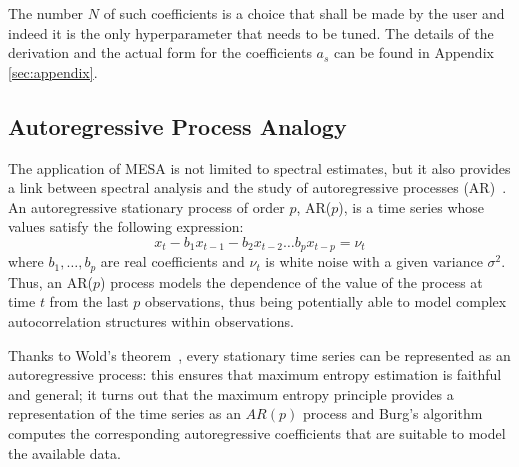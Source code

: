 \documentclass{aa}
\begin{document}
The number $N$ of such coefficients is a choice that shall be made by the user and indeed it is the only hyperparameter that needs to be tuned. The details of the derivation and the actual form for the coefficients $a_s$ can be found in Appendix \ref{sec:appendix}.

\subsection{Autoregressive Process Analogy} \label{sec:autoregr}

The application of MESA is not limited to spectral estimates, but it also provides a link between spectral analysis and the study
of autoregressive processes (AR)~\citep{doi:10.1029/RG013i001p00183}.
An autoregressive stationary process of order $p$, AR($p$), is a time series whose values satisfy the following expression: 
\begin{equation} \label{eq:AR_p}
    x_t - b_1 x_{t-1} - b_2 x_{t-2} \dots b_p x_{t - p} = \nu_t
\end{equation}
where $b_1, \ldots, b_p$ are real coefficients and $\nu_t$ is white noise with a given variance $\sigma^2$.
Thus, an AR($p$) process models the dependence of the value of the process at time $t$ from the last $p$ observations, 
thus being potentially able to model complex autocorrelation structures within observations.

Thanks to Wold's theorem~\citep{Wold_theorem}, every stationary time series can be represented as an autoregressive process: this ensures that maximum entropy estimation is faithful and general; it turns out that the maximum entropy principle provides a representation of the time series as an $AR(p)$ process and Burg's algorithm computes the corresponding autoregressive coefficients that are suitable to model the available data.
\end{document}
